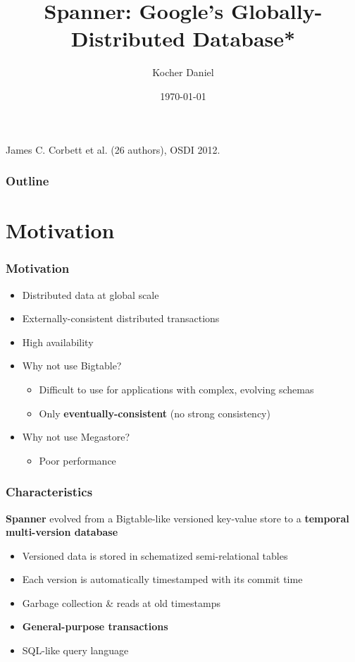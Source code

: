 \documentclass{beamer}
\title[]{Spanner: Google's Globally-Distributed Database*}
\subtitle[]{}
\author{Kocher Daniel}
\institute[PLUS] 
{
Summarizing Talk \newline
Efficent Algorithms Seminar \newline
University of Salzburg
}
\date{\today}
\begin{document}
\begin{frame}
\titlepage
{\footnotesize* James C. Corbett et al. (26 authors), OSDI 2012.}
\end{frame}

\begin{frame}
\frametitle{Outline} 
\tableofcontents[hideallsubsections]
\end{frame}

\section{Motivation}
\begin{frame}
	\frametitle{Motivation}
	\begin{itemize}
    \item{Distributed data at global scale}
    \item{Externally-consistent distributed transactions}
    \item{High availability}
    \pause
    \item{Why not use Bigtable?}
    \begin{itemize}
      \item{Difficult to use for applications with complex, evolving schemas}
      \item{Only \textbf{eventually-consistent} (no strong consistency)}
    \end{itemize}
    \pause
    \item{Why not use Megastore?}
    \begin{itemize}
      \item{Poor performance}
    \end{itemize}
  \end{itemize}
\end{frame}

\begin{frame}
  \frametitle{Characteristics}
  \begin{center}
    \textbf{Spanner} evolved from a Bigtable-like versioned key-value store to a
    \textbf{temporal multi-version database}
  \end{center}
  \pause
  \begin{itemize}
    \item{Versioned data is stored in schematized semi-relational tables}
    \item{Each version is automatically timestamped with its commit time}
    \item{Garbage collection \& reads at old timestamps}
    \item{\textbf{General-purpose transactions}}
    \item{SQL-like query language}
  \end{itemize}
\end{frame}
\end{document}
